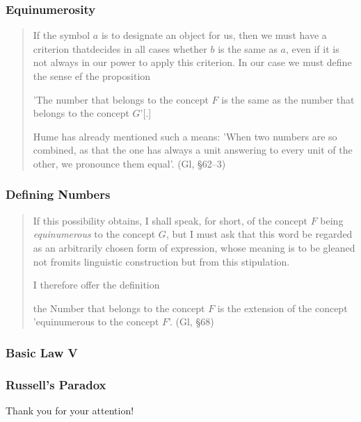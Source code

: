 \documentclass[compress,12pt]{beamer}
\begin{document}
\begin{frame}
    \frametitle{Equinumerosity}
    \begin{quote}
        If the symbol $a$ is to designate an object for us, then we must have a criterion thatdecides in all cases whether $b$ is the same as $a$, even if it is not always in our power to apply this criterion. In our case we must define the sense ef the proposition
        
        'The number that belongs to the concept $F$ is the same as the number that belongs to the concept $G$'[.]

        Hume has already mentioned such a means: 'When two numbers are so combined, as that the one has always a unit answering to every unit of the other, we pronounce them equal'. (Gl, \S62--3)
    \end{quote}
\end{frame}

\begin{frame}
    \frametitle{Defining Numbers}
    \begin{quote}
        If this possibility obtains, I shall speak, for short, of the concept $F$ being \emph{equinumerous} to the concept $G$, but I must ask that this word be regarded as an arbitrarily chosen form of expression, whose meaning is to be gleaned not fromits linguistic construction but from this stipulation.

        I therefore offer the definition

        the Number that belongs to the concept $F$ is the extension of the concept 'equinumerous to the concept $F$'. (Gl, \S68)
    \end{quote}

\end{frame}


\begin{frame}
    \frametitle{Basic Law V}

\end{frame}

\begin{frame}
    \frametitle{Russell's Paradox}

    

\end{frame}

\End

\begin{frame}
      \centering\large
      Thank you for your attention!
      
\end{frame}
\end{document}
